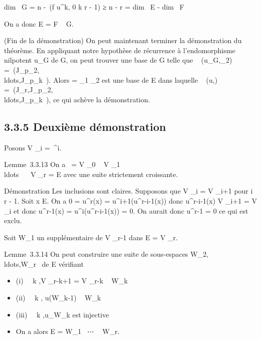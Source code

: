 \documentclass[]{article}
\begin{document}
dim~ G = n
-\mathrmrg~(f \cdot
u^k, 0 \leq k \leq r - 1) ≥ n - r = dim~ E
- dim~ F

On a donc E = F \oplus~ G.

(Fin de la démonstration) On peut maintenant terminer la démonstration
du théorème. En appliquant notre hypothèse de récurrence à
l'endomorphisme nilpotent u_G de G, on peut trouver
une base de G telle que
\mathrmMat~
(u_G,_2) =\
\mathrmdiag(J_p_2,\\ldots,J_p_k~).
Alors  = _1 \cup{}_2 est une base de E dans laquelle
\mathrmMat~ (u,\mathcal{E})
=\
\mathrmdiag(J_r,J_p_2,\\ldots,J_p_k~),
ce qui achève la démonstration.

\subsection{3.3.5 Deuxième démonstration}

Posons V _i =\
\mathrmKeru^i.

Lemme~3.3.13 On a \0\ = V _0
\subset~ V _1
\subset~\\ldots~ \subset~ V
_r = E avec une suite strictement croissante.

Démonstration Les inclusions sont claires. Supposons que V _i =
V _i+1 pour i \leq r - 1. Soit x \in E. On a 0 = u^r(x) =
u^i+1(u^r-i-1(x)) donc u^r-i-1(x) \in V
_i+1 = V _i et donc u^r-1(x) =
u^i(u^r-i-1(x)) = 0. On aurait donc
u^r-1 = 0 ce qui est exclu.

Soit W_1 un supplémentaire de V _r-1 dans E = V
_r.

Lemme~3.3.14 On peut construire une suite de sous-espaces
W_2,\\ldots,W_r~
de E vérifiant

\begin{itemize}
\itemsep1pt\parskip0pt
\item
  (i) \forall~~k \in [1,r],\quad V
  _r-k+1 = V _r-k \oplus~ W_k
\item
  (ii) \forall~~k \in [2,r],\quad
  u(W_k-1) \subset~ W_k
\item
  (iii) \forall~~k \in [1,r -
  1],\quad u_W_k est
  injective
\item
  On a alors E = W_1 \oplus~⋯ \oplus~
  W_r.
\end{itemize}
\end{document}
